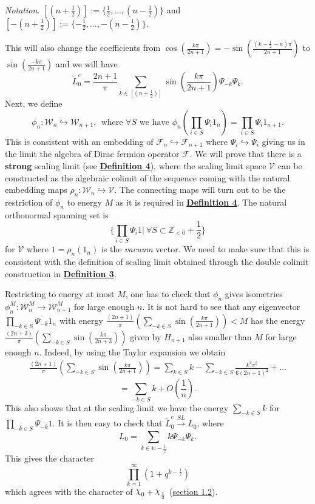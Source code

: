\documentclass[twoside,11pt,titlepage]{amsart}
\renewcommand{\=}[1]{\stackrel{#1}{=}} %
\theoremstyle{definition}
\theoremstyle{remark}
\DeclareRobustCommand{\rchi}{{\mathpalette\irchi\relax}}
\newcommand{\irchi}[2]{\raisebox{\depth}{$#1\chi$}}
\begin{document}
\textit{Notation}. $[(n+\frac{1}{2})]:=\{\frac{1}{2},\ldots,(n-\frac{1}{2})\}$ and $[-(n+\frac{1}{2})]:=\{-\frac{1}{2},\ldots,-(n-\frac{1}{2})\}$.

This will also change the coefficients from $\cos(\frac{k\pi}{2n+1})=-\sin(\frac{(k-\frac{1}{2}-n)\pi}{2n+1})$ to $\sin(\frac{-k\pi}{2n+1})$ and we will have
$$\widetilde{L}_0^c=\frac{2n+1}{\pi}\sum_{k \in [(n+\frac{1}{2})]} \sin(\frac{k\pi}{2n+1})\Psi_{-k}\Psi_{k}.$$
Next, we define 
$$\phi_n:\mathcal{W}_n \hookrightarrow \mathcal{W}_{n+1}, \ \ \text{where }\forall S \text{ we have } \phi_n(\prod_{i \in S} \Psi_{i}1_n)=\prod_{i \in S} \Psi_{i}1_{n+1}.$$
This is consistent with an embedding of $\mathcal{F}_n \hookrightarrow \mathcal{F}_{n+1}$ where $\Psi_i \hookrightarrow \Psi_i$ giving us in the limit the algebra of Dirac fermion operator $\mathcal{F}$. We will prove that there is a \textbf{strong} scaling limit (see \hyperref[dfn4]{\textbf{Definition 4}}), where the scaling limit space $\mathcal{V}$ can be constructed as the algebraic colimit of the sequence coming with the natural embedding maps $\rho_n: \mathcal{W}_n \hookrightarrow \mathcal{V}$. The connecting maps will turn out to be the restriction of $\phi_n$ to energy $M$ as it is required in \hyperref[dfn4]{\textbf{Definition 4}}. The natural orthonormal spanning set is 
$$\{\prod_{i \in S} \Psi_i1| \ \forall S \subset \mathbb{Z}_{<0}+\frac{1}{2}\}$$
for $\mathcal{V}$ where $1=\rho_n(1_n)$ is the \textit{vacuum} vector. We need to make sure that this is consistent with the definition of scaling limit obtained through the double colimit construction in \hyperref[dfn3]{\textbf{Definition 3}}.

Restricting to energy at most $M$, one has to check that $\phi_n$ gives isometries $\phi_n^M : \mathcal{W}_n^M \rightarrow \mathcal{W}_{n+1}^M$ for large enough $n$. It is not hard to see that any eigenvector $\prod_{-k \in S} \Psi_{-k} 1_n$ with energy $\frac{(2n+1)}{\pi}(\sum_{-k \in S} \sin(\frac{k\pi}{2n+1})) < M$ has the energy $\frac{(2n+3)}{\pi}(\sum_{-k \in S} \sin(\frac{k\pi}{2n+3}))$ given by $H_{n+1}$ also smaller than $M$ for large enough $n$. Indeed, by using the Taylor expansion we obtain
\begin{align}\label{eq18}
\frac{(2n+1)}{\pi}(\sum\limits_{-k \in S} \sin(\frac{k\pi}{2n+1}))=\sum\limits_{k \in S}k - \sum\limits_{-k \in S}\frac{k^3 \pi^2}{6(2n+1)^2}+\ldots
\end{align}
$$=\sum\limits_{-k \in S}k+O(\frac{1}{n}).$$
This also shows that at the scaling limit we have the energy $\sum_{-k \in S} k$ for $\prod_{-k \in S} \Psi_{-k} 1$. It is then easy to check that $\widetilde{L}_0^c \xrightarrow{SL} L_0$, where
$$L_0=\sum_{k \in \mathbb{N}-\frac{1}{2}}k\Psi_{-k}\Psi_k.$$
This gives the character 
$$\prod_{k=1}^{\infty} (1+q^{k-\frac{1}{2}})$$
which agrees with the character of $\rchi_0+\rchi_\frac{1}{2}$ (\hyperref[1.2]{section 1.2}). 
\end{document}
